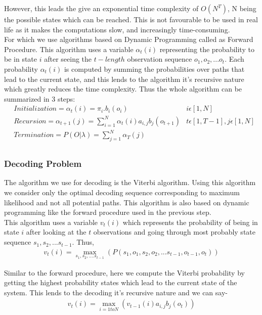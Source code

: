 \documentclass[10pt,twocolumn,letterpaper]{article}
\begin{document}
However, this leads the give an exponential time complexity of $O(N^T)$, N being the possible states which can be reached. This is not favourable to be used in real life as it makes the computations slow, and increasingly time-consuming. \\

For which we use algorithms based on Dynamic Programming called as Forward Procedure. This algorithm uses a variable
$\alpha_t(i)$ representing the probability to be in state $i$ after seeing the $t-length$ observation sequence $o_1, o_2,... o_t$. Each probability $\alpha_t(i)$ is computed by summing the probabilities over paths that lead to the current state, and this lends to the algorithm it's recursive nature which greatly reduces the time complexity. 
Thus the whole algorithm can be summarized in 3 steps: \\
\begin{align*}
    &Initialization = \alpha_t(i) = \pi_i.b_i(o_i) & i \epsilon [1, N]\\
    &Recursion = \alpha_{t+1}(j) = \sum_{i=1}^{N}\alpha_t(i)a_{i,j}b_j(o_{t+1})&t \epsilon [1, T-1], j \epsilon [1, N] \\
    &Termination = P(O|\lambda) = \sum_{j=1}^{N}\alpha_T(j)\\
\end{align*}

\subsubsection{Decoding Problem}
The algorithm we use for decoding is the Viterbi algorithm. Using this algorithm we consider only the optimal decoding sequence corresponding to maximum likelihood and not all potential paths. This algorithm is also based on dynamic programming like the forward procedure used in the previous step. \\

This algorithm uses a variable $v_t(i)$ which represents the probability of being in state $i$ after looking at the $t$ observations and going through most probably state sequence $s_1, s_2,... s_{t-1}$. Thus,
\begin{align*}
    v_t(i) = \mathop{max}_{s_1, s_2,....s_{t-1}}( P(s_1, o_1, s_2, o_2,... s_{t-1}, o_{t-1}, o_t))
\end{align*}

Similar to the forward procedure, here we compute the Viterbi probability by getting the highest probability states which lead to the current state of the system. This lends to the decoding it's recursive nature and we can say- \\
\begin{align*}
    v_t(i) = \mathop{max}_{i = 1 to N} (v_{t-1}(i)a_{i,j}b_j(o_t))
\end{align*}
\end{document}
